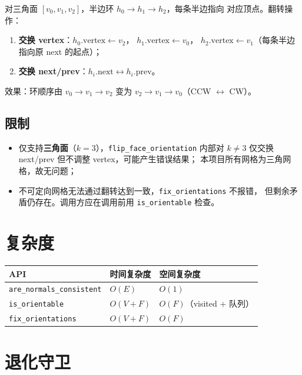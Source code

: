 \documentclass[11pt,a4paper]{article}
\begin{document}
对三角面 $[v_0, v_1, v_2]$，半边环 $h_0 \to h_1 \to h_2$，每条半边指向
对应顶点。翻转操作：

\begin{enumerate}
  \item \textbf{交换 vertex}：$h_0.\mathrm{vertex} \gets v_2$，
        $h_1.\mathrm{vertex} \gets v_0$，
        $h_2.\mathrm{vertex} \gets v_1$（每条半边指向原 next 的起点）；
  \item \textbf{交换 next/prev}：$h_i.\mathrm{next} \leftrightarrow h_i.\mathrm{prev}$。
\end{enumerate}

效果：环顺序由 $v_0 \to v_1 \to v_2$ 变为 $v_2 \to v_1 \to v_0$（CCW $\leftrightarrow$ CW）。

\subsection{限制}

\begin{itemize}
  \item 仅支持\textbf{三角面}（$k = 3$），\texttt{flip\_face\_orientation}
        内部对 $k \ne 3$ 仅交换 next/prev 但不调整 vertex，可能产生错误结果；
        本项目所有网格为三角网格，故无问题；
  \item 不可定向网格无法通过翻转达到一致，\texttt{fix\_orientations} 不报错，
        但剩余矛盾仍存在。调用方应在调用前用 \texttt{is\_orientable} 检查。
\end{itemize}

\section{复杂度}

\begin{center}
\renewcommand{\arraystretch}{1.18}
\begin{tabular}{@{}lll@{}}
  \toprule
  \textbf{API} & \textbf{时间复杂度} & \textbf{空间复杂度} \\
  \midrule
  \texttt{are\_normals\_consistent} & $O(E)$ & $O(1)$ \\
  \texttt{is\_orientable}           & $O(V + F)$ & $O(F)$（visited + 队列） \\
  \texttt{fix\_orientations}        & $O(V + F)$ & $O(F)$ \\
  \bottomrule
\end{tabular}
\end{center}

\section{退化守卫}
\end{document}
